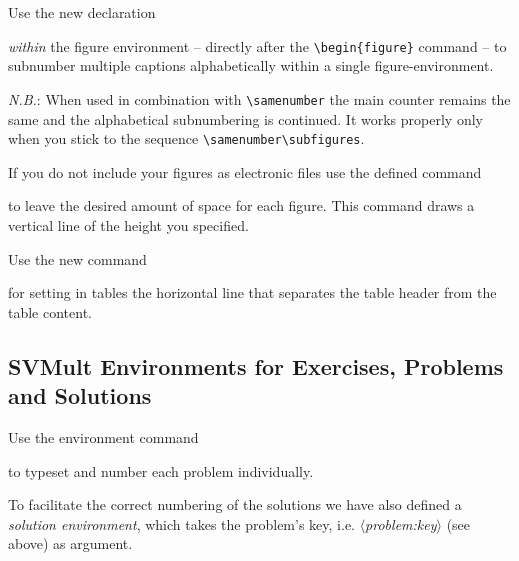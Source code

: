 \documentclass[graybox]{svmult}
\begin{document}
\begin{refguide}
\begin{sloppy}
Use the new declaration

\cprotect\boxtext{\verb|\subfigures|}

\textit{within} the figure environment -- directly after the \verb|\begin{figure}| command --
to subnumber multiple captions alphabetically within a single figure-environment.

\textit{N.B.}: When used in combination with \verb|\samenumber| the main counter remains
the same and the alphabetical subnumbering is continued. It works properly
only when you stick to the sequence \verb|\samenumber\subfigures|.

If you do not include your figures as electronic files use the defined command

\cprotect{}

to leave the desired amount of space for each figure. This command draws a
vertical line of the height you specified.

Use the new command

\cprotect\boxtext{\verb|\svhline|}

for setting in tables the horizontal line that separates the table header from the
table content.

\subsection{SVMult Environments for Exercises, Problems and Solutions}\label{subsec:8}

Use the environment command

\cprotect{}

to typeset and number each problem individually.

To facilitate the correct numbering of the solutions we have also defined a \textit{solution environment}, which takes the problem's key, i.e. \verb||$\langle$\textit{problem:key}$\rangle$\verb|| (see above) as argument.


\end{sloppy}
\end{refguide}
\end{document}
